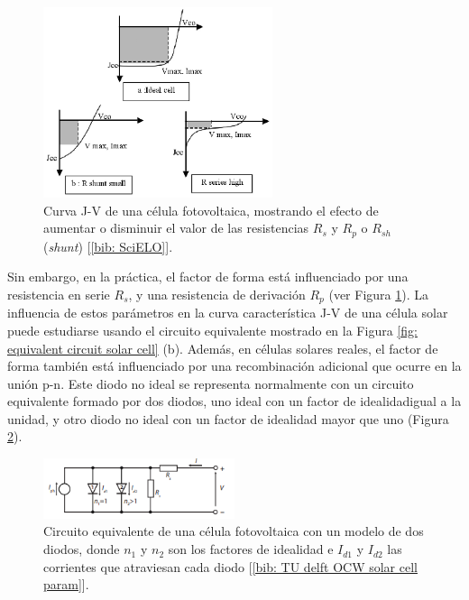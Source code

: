 \documentclass[12pt]{article}
\begin{document}
	\pagebreak
	
	\begin{figure}[h!]
		\begin{center}
			\includegraphics[width=0.6\textwidth]{img/JV_curve_withRsRp.png}
			\caption{Curva J-V de una célula fotovoltaica, mostrando el efecto de aumentar o disminuir el valor de las resistencias $R_{s}$ y $R_{p}$ o $R_{sh}$ (\textit{shunt}) [\ref{bib: SciELO}].}
			\label{fig: JV curve with non-ideal model (one diode)}
		\end{center}
	\end{figure}

	\noindent Sin embargo, en la práctica, el factor de forma está influenciado por una resistencia en serie $R_{s}$, y una resistencia de derivación $R_{p}$ (ver Figura \ref{fig: JV curve with non-ideal model (one diode)}). La influencia de estos parámetros en la curva característica J-V de una célula solar puede estudiarse usando el circuito equivalente mostrado en la Figura \ref{fig: equivalent circuit solar cell} (b). Además, en células solares reales, el factor de forma también está influenciado por una recombinación adicional que ocurre en la unión p-n. Este diodo no ideal se representa normalmente con un circuito equivalente formado por dos diodos, uno ideal con un factor de idealidad\footnotemark \enspace igual a la unidad, y otro diodo no ideal con un factor de idealidad mayor que uno (Figura \ref{fig: non-Ideal equivalent circuit solar cell}). \\
	

	
	\begin{figure}[h!]
		\begin{center}
			\includegraphics[width=0.5\textwidth]{img/nonIdeal_equivCircuit_solarCell.png}
			\caption{Circuito equivalente de una célula fotovoltaica con un modelo de dos diodos, donde $n_{1}$ y $n_{2}$ son los factores de idealidad e $I_{d1}$ y $I_{d2}$ las corrientes que atraviesan cada diodo [\ref{bib: TU delft OCW solar cell param}].}
			\label{fig: non-Ideal equivalent circuit solar cell}
		\end{center}
	\end{figure}	
	
\end{document}
